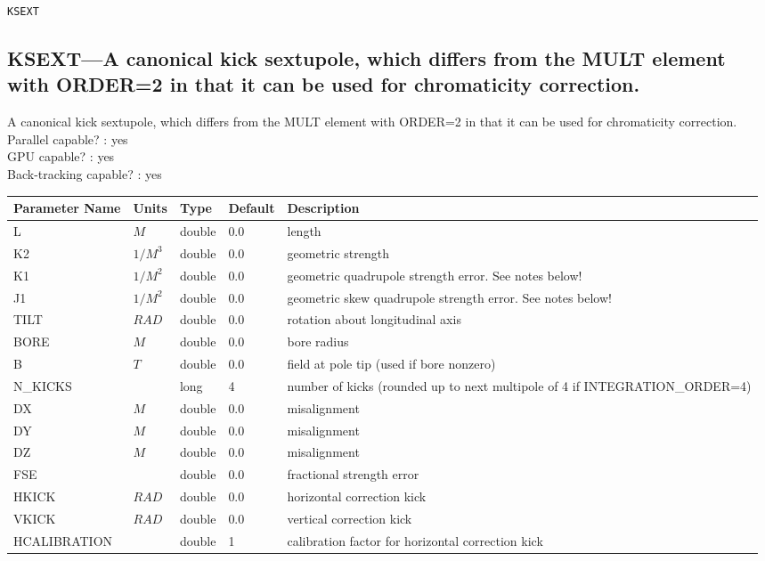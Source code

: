 \newpage
\begin{center}{\Large\verb|KSEXT|}\end{center}
\subsection{KSEXT---A canonical kick sextupole, which differs from the MULT element with ORDER=2 in that it can be used for chromaticity correction.}
A canonical kick sextupole, which differs from the MULT element with ORDER=2 in that it can be used for chromaticity correction.
\\
Parallel capable? : yes\\
GPU capable? : yes\\
Back-tracking capable? : yes\\
\begin{tabular}{|l|l|l|l|p{\descwidth}|} \hline
Parameter Name & Units & Type & Default & Description \\ \hline 
L & $M$ & double &  0.0 & length  \\ \hline 
K2 & $1/M^{3}$ & double &  0.0 & geometric strength  \\ \hline 
K1 & $1/M^{2}$ & double &  0.0 & geometric quadrupole strength error. See notes below!  \\ \hline 
J1 & $1/M^{2}$ & double &  0.0 & geometric skew quadrupole strength error. See notes below!  \\ \hline 
TILT & $RAD$ & double &  0.0 & rotation about longitudinal axis  \\ \hline 
BORE & $M$ & double &  0.0 & bore radius  \\ \hline 
B & $T$ & double &  0.0 & field at pole tip (used if bore nonzero)  \\ \hline 
N\_KICKS &  & long &   4               & number of kicks (rounded up to next multipole of 4 if INTEGRATION\_ORDER=4)  \\ \hline 
DX & $M$ & double &  0.0 & misalignment  \\ \hline 
DY & $M$ & double &  0.0 & misalignment  \\ \hline 
DZ & $M$ & double &  0.0 & misalignment  \\ \hline 
FSE &  & double &  0.0 & fractional strength error  \\ \hline 
HKICK & $RAD$ & double &  0.0 & horizontal correction kick  \\ \hline 
VKICK & $RAD$ & double &  0.0 & vertical correction kick  \\ \hline 
HCALIBRATION &  & double &   1 & calibration factor for horizontal correction kick  \\ \hline 

\end{tabular}
